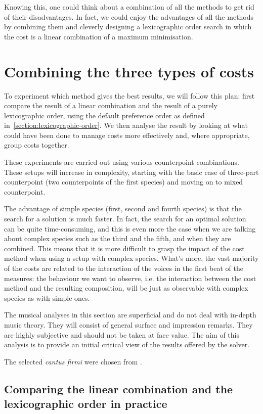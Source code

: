 Knowing this, one could think about a combination of all the methods to get rid of their disadvantages. In fact, we could enjoy the advantages of all the methods by combining them and cleverly designing a lexicographic order search in which the cost is a linear combination of a maximum minimisation.

\section{Combining the three types of costs}
To experiment which method gives the best results, we will follow this plan: first compare the result of a linear combination and the result of a purely lexicographic order, using the default preference order as defined in~\ref{section:lexicographic-order}. We then analyse the result by looking at what could have been done to manage costs more effectively and, where appropriate, group costs together.

These experiments are carried out using various counterpoint combinations. These setups will increase in complexity, starting with the basic case of three-part counterpoint (two counterpoints of the first species) and moving on to mixed counterpoint.

The advantage of simple species (first, second and fourth species) is that the search for a solution is much faster. In fact, the search for an optimal solution can be quite time-consuming, and this is even more the case when we are talking about complex species such as the third and the fifth, and when they are combined. This means that it is more difficult to grasp the impact of the cost method when using a setup with complex species. What's more, the vast majority of the costs are related to the interaction of the voices in the first beat of the measures: the behaviour we want to observe, i.e. the interaction between the cost method and the resulting composition, will be just as observable with complex species as with simple ones. 

The musical analyses in this section are superficial and do not deal with in-depth music theory. They will consist of general surface and impression remarks. They are highly subjective and should not be taken at face value. The aim of this analysis is to provide an initial critical view of the results offered by the solver. 

The selected \textit{cantus firmi} were chosen from \gap. 
\subsection{Comparing the linear combination and the lexicographic order in practice}
